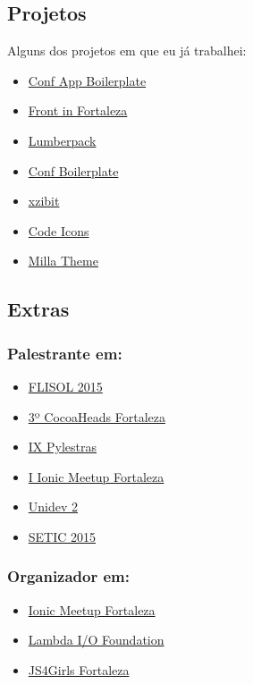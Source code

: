 \documentclass[]{article}
\providecommand{\tightlist}{%
  \setlength{\itemsep}{0pt}\setlength{\parskip}{0pt}}
\begin{document}
\subsection{Projetos}\label{projetos}

Alguns dos projetos em que eu já trabalhei:

\begin{itemize}
\tightlist
\item
  \href{https://github.com/devevents/conf-app-boilerplate}{Conf App
  Boilerplate}
\item
  \href{https://play.google.com/store/apps/details?id=com.devevents.frontinfortaleza}{Front
  in Fortaleza}
\item
  \href{https://github.com/mabrasil/lumberpack}{Lumberpack}
\item
  \href{https://github.com/mabrasil/conf-boilerplate}{Conf Boilerplate}
\item
  \href{https://github.com/mabrasil/xzibit}{xzibit}
\item
  \href{https://github.com/mabrasil/codeicons}{Code Icons}
\item
  \href{https://github.com/mabrasil/milla-theme}{Milla Theme}
\end{itemize}

\subsection{Extras}\label{extras}

\subsubsection{Palestrante em:}\label{palestrante-em}

\begin{itemize}
\tightlist
\item
  \href{http://flisolce.org/}{FLISOL 2015}
\item
  \href{http://www.cocoaheads.com.br/agendas/detalhes/79/}{3º CocoaHeads
  Fortaleza}
\item
  \href{http://pylestras.org/evento/ix-pylestras/}{IX Pylestras}
\item
  \href{http://www.meetup.com/pt/Ionic-Ceara/events/224620543/}{I Ionic
  Meetup Fortaleza}
\item
  \href{http://unidevce.github.io/}{Unidev 2}
\item
  \href{http://www.seti.ufc.br/}{SETIC 2015}
\end{itemize}

\subsubsection{Organizador em:}\label{organizador-em}

\begin{itemize}
\tightlist
\item
  \href{http://ionicbrazil.com/}{Ionic Meetup Fortaleza}
\item
  \href{https://github.com/lambda-io}{Lambda I/O Foundation}
\item
  \href{http://js4girls-fortaleza.github.io/}{JS4Girls Fortaleza}
\end{itemize}
\end{document}
